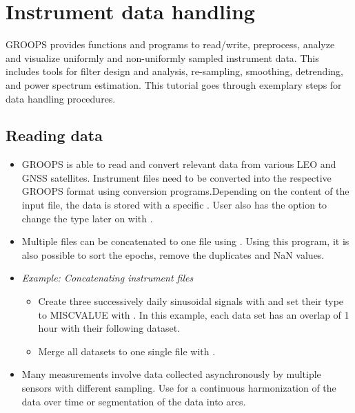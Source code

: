 \section{Instrument data handling}\label{cookbook.instrument}

GROOPS provides functions and programs to read/write, preprocess, analyze and visualize uniformly and non-uniformly sampled instrument data.
This includes tools for filter design and analysis, re-sampling, smoothing, detrending, and power spectrum estimation.
This tutorial goes through exemplary steps for data handling procedures.

\subsection{Reading data}

\begin{itemize}
\item GROOPS is able to read and convert relevant data from various LEO and GNSS satellites. Instrument files need to be converted into the respective GROOPS format using conversion programs.Depending on the content of the input file, the data is stored with a specific . User also has the option to change the type later on with .

\item Multiple files can be concatenated to one file using . Using this program, it is also possible to sort the epochs, remove the duplicates and NaN values.
\item \emph{Example: Concatenating instrument files}
  \begin{itemize}
  \item Create three successively daily sinusoidal signals with  and set their type to MISCVALUE with . In this example, each data set has an overlap of 1 hour with their following dataset.
  \item Merge all datasets to one single file with .
  \end{itemize}
 \item Many measurements involve data collected asynchronously by multiple sensors with different sampling. Use  for a continuous harmonization of the data over time or segmentation of the data into arcs.
\end{itemize}


